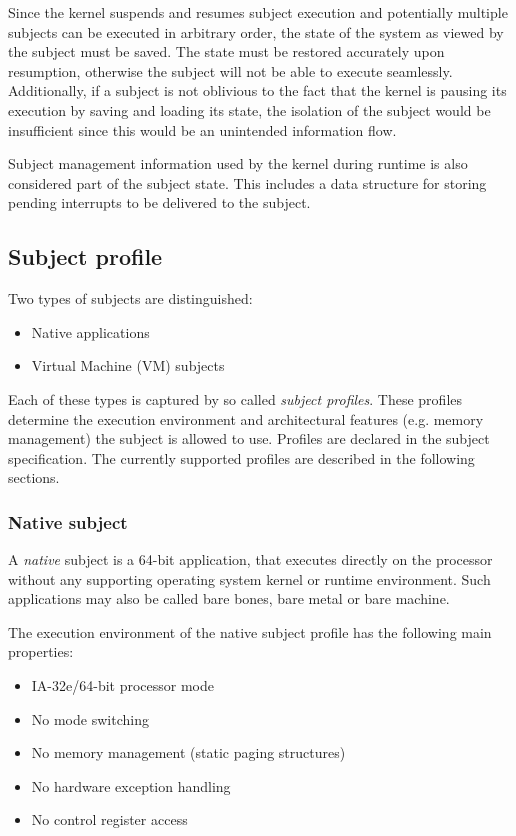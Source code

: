 Since the kernel suspends and resumes subject execution and potentially
multiple subjects can be executed in arbitrary order, the state of the system
as viewed by the subject must be saved. The state must be restored accurately
upon resumption, otherwise the subject will not be able to execute seamlessly.
Additionally, if a subject is not oblivious to the fact that the kernel is
pausing its execution by saving and loading its state, the isolation of the
subject would be insufficient since this would be an unintended information
flow.

Subject management information used by the kernel during runtime is also
considered part of the subject state. This includes a data structure for
storing pending interrupts to be delivered to the subject.

\subsection{Subject profile}
Two types of subjects are distinguished:

\begin{itemize}
	\item Native applications
	\item Virtual Machine (VM) subjects
\end{itemize}

Each of these types is captured by so called \emph{subject
profiles}. These profiles determine the execution
environment and architectural features (e.g.  memory management) the subject is
allowed to use. Profiles are declared in the subject specification. The
currently supported profiles are described in the following sections.

\subsubsection{Native subject}
A \emph{native} subject is a 64-bit application, that executes directly on the
processor without any supporting operating system kernel or runtime environment.
Such applications may also be called bare bones, bare metal or bare machine.

The execution environment of the native subject profile has the following main
properties:

\begin{itemize}
	\item IA-32e/64-bit processor mode
	\item No mode switching
	\item No memory management (static paging structures)
	\item No hardware exception handling
	\item No control register access
\end{itemize}

